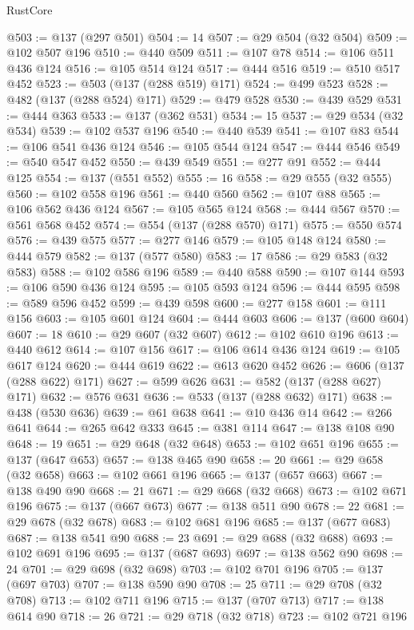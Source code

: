 \begin{lexlean}{RustCore}
\begin{coremodule}
@503 := @137 (@297 @501)
@504 := 14
@507 := @29 @504 (@32 @504)
@509 := @102 @507 @196
@510 := @440 @509
@511 := @107 @78
@514 := @106 @511 @436 @124
@516 := @105 @514 @124
@517 := @444 @516
@519 := @510 @517 @452
@523 := @503 (@137 (@288 @519) @171)
@524 := @499 @523
@528 := @482 (@137 (@288 @524) @171)
@529 := @479 @528
@530 := @439 @529
@531 := @444 @363
@533 := @137 (@362 @531)
@534 := 15
@537 := @29 @534 (@32 @534)
@539 := @102 @537 @196
@540 := @440 @539
@541 := @107 @83
@544 := @106 @541 @436 @124
@546 := @105 @544 @124
@547 := @444 @546
@549 := @540 @547 @452
@550 := @439 @549
@551 := @277 @91
@552 := @444 @125
@554 := @137 (@551 @552)
@555 := 16
@558 := @29 @555 (@32 @555)
@560 := @102 @558 @196
@561 := @440 @560
@562 := @107 @88
@565 := @106 @562 @436 @124
@567 := @105 @565 @124
@568 := @444 @567
@570 := @561 @568 @452
@574 := @554 (@137 (@288 @570) @171)
@575 := @550 @574
@576 := @439 @575
@577 := @277 @146
@579 := @105 @148 @124
@580 := @444 @579
@582 := @137 (@577 @580)
@583 := 17
@586 := @29 @583 (@32 @583)
@588 := @102 @586 @196
@589 := @440 @588
@590 := @107 @144
@593 := @106 @590 @436 @124
@595 := @105 @593 @124
@596 := @444 @595
@598 := @589 @596 @452
@599 := @439 @598
@600 := @277 @158
@601 := @111 @156
@603 := @105 @601 @124
@604 := @444 @603
@606 := @137 (@600 @604)
@607 := 18
@610 := @29 @607 (@32 @607)
@612 := @102 @610 @196
@613 := @440 @612
@614 := @107 @156
@617 := @106 @614 @436 @124
@619 := @105 @617 @124
@620 := @444 @619
@622 := @613 @620 @452
@626 := @606 (@137 (@288 @622) @171)
@627 := @599 @626
@631 := @582 (@137 (@288 @627) @171)
@632 := @576 @631
@636 := @533 (@137 (@288 @632) @171)
@638 := @438 (@530 @636)
@639 := @61 @638
@641 := @10 @436 @14
@642 := @266 @641
@644 := @265 @642 @333
@645 := @381 @114
@647 := @138 @108 @90
@648 := 19
@651 := @29 @648 (@32 @648)
@653 := @102 @651 @196
@655 := @137 (@647 @653)
@657 := @138 @465 @90
@658 := 20
@661 := @29 @658 (@32 @658)
@663 := @102 @661 @196
@665 := @137 (@657 @663)
@667 := @138 @490 @90
@668 := 21
@671 := @29 @668 (@32 @668)
@673 := @102 @671 @196
@675 := @137 (@667 @673)
@677 := @138 @511 @90
@678 := 22
@681 := @29 @678 (@32 @678)
@683 := @102 @681 @196
@685 := @137 (@677 @683)
@687 := @138 @541 @90
@688 := 23
@691 := @29 @688 (@32 @688)
@693 := @102 @691 @196
@695 := @137 (@687 @693)
@697 := @138 @562 @90
@698 := 24
@701 := @29 @698 (@32 @698)
@703 := @102 @701 @196
@705 := @137 (@697 @703)
@707 := @138 @590 @90
@708 := 25
@711 := @29 @708 (@32 @708)
@713 := @102 @711 @196
@715 := @137 (@707 @713)
@717 := @138 @614 @90
@718 := 26
@721 := @29 @718 (@32 @718)
@723 := @102 @721 @196

\end{coremodule}
\end{lexlean}
